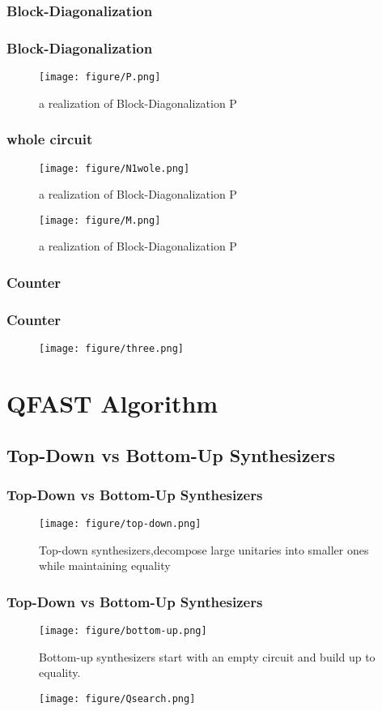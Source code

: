 \documentclass[aspectratio=1610]{beamer}
\begin{document}
\subsubsection{Block-Diagonalization}
\begin{frame}
\frametitle{Block-Diagonalization}
\begin{figure}
  \texttt{[image: figure/P.png]}
  \caption{a realization of Block-Diagonalization P}
\end{figure}
\end{frame}
\begin{frame}
  \frametitle{whole circuit}
  \begin{figure}
    \texttt{[image: figure/N1wole.png]}
    \caption{a realization of Block-Diagonalization P}
  \end{figure}
  \begin{figure}
    \texttt{[image: figure/M.png]}
    \caption{a realization of Block-Diagonalization P}
  \end{figure}
\end{frame}
\subsubsection{Counter}
\begin{frame}
\frametitle{Counter}
  \begin{figure}
    \texttt{[image: figure/three.png]}
  \end{figure}

\end{frame}

\section{QFAST Algorithm}

\subsection{Top-Down vs Bottom-Up Synthesizers}
\begin{frame}
\frametitle{Top-Down vs Bottom-Up Synthesizers}
\begin{figure}
  \texttt{[image: figure/top-down.png]}
  \caption{Top-down synthesizers,decompose large unitaries into smaller ones while maintaining equality}
\end{figure}
\end{frame}
\begin{frame}
  \frametitle{Top-Down vs Bottom-Up Synthesizers}
  \begin{figure}
    \texttt{[image: figure/bottom-up.png]}
    \caption{Bottom-up synthesizers start with an empty circuit and build up to equality.}
  \end{figure}
  \begin{figure}
    \texttt{[image: figure/Qsearch.png]}
  \end{figure}
\end{frame}
\end{document}

